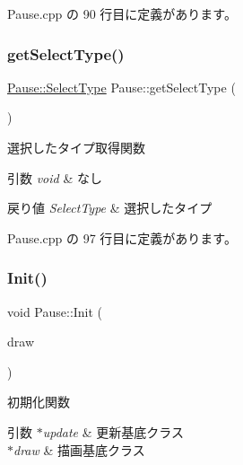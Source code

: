  Pause.\+cpp の 90 行目に定義があります。

\mbox{\label{class_pause_a0c6bf0b0e82e2beace53808e3d08d45f}} 
\subsubsection{\texorpdfstring{get\+Select\+Type()}{getSelectType()}}
{\footnotesize\ttfamily \mbox{\hyperlink{class_pause_a13a552c560a41cf0b17cbef35f8fece7}{Pause\+::\+Select\+Type}} Pause\+::get\+Select\+Type (\begin{DoxyParamCaption}{ }\end{DoxyParamCaption})}



選択したタイプ取得関数 


\begin{DoxyParams}{引数}
{\em void} & なし \\
\hline
\end{DoxyParams}

\begin{DoxyRetVals}{戻り値}
{\em Select\+Type} & 選択したタイプ \\
\hline
\end{DoxyRetVals}


 Pause.\+cpp の 97 行目に定義があります。

\mbox{\label{class_pause_a0986aa6eb5fcf9375408b47150d6f611}} 
\subsubsection{\texorpdfstring{Init()}{Init()}}
{\footnotesize\ttfamily void Pause\+::\+Init (\begin{DoxyParamCaption}\item[{\mbox{\hyperlink{class_draw_base}{Draw\+Base}} $\ast$}]{draw }\end{DoxyParamCaption})}



初期化関数 


\begin{DoxyParams}{引数}
{\em $\ast$update} & 更新基底クラス \\
\hline
{\em $\ast$draw} & 描画基底クラス \\
\hline
\end{DoxyParams}

